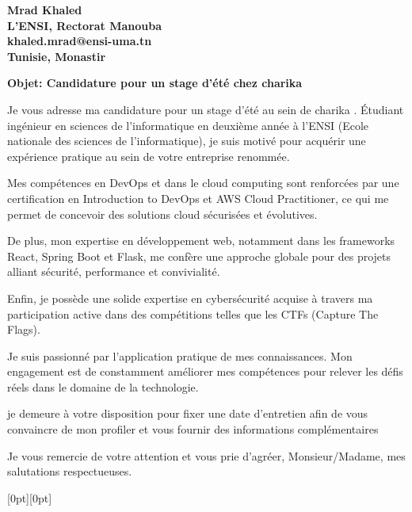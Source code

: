 \documentclass[a4paper, 12pt]{letter}
\date{}
\begin{document}
\begin{letter}
{
\selectfont
\bfseries
    Mrad Khaled\\
    L'ENSI, Rectorat Manouba\\
    khaled.mrad@ensi-uma.tn	\\ Tunisie, Monastir 	 \newline \newline
    
 
    
}

\opening { {
\selectfont
\bfseries Objet: Candidature pour un stage d'été chez charika } \newline}

\selectfont

Je vous adresse ma candidature pour un stage d'été au sein de charika . Étudiant ingénieur en sciences de l'informatique en deuxième année à l'ENSI (Ecole nationale des sciences de l'informatique), je suis motivé pour acquérir une expérience pratique au sein de votre entreprise renommée.

Mes compétences en DevOps et dans le cloud computing sont renforcées par une certification en Introduction to DevOps et AWS Cloud Practitioner, ce qui me permet de concevoir des solutions cloud sécurisées et évolutives.

De plus, mon expertise en développement web, notamment dans les frameworks React, Spring Boot et Flask, me confère une approche globale pour des projets alliant sécurité, performance et convivialité.

Enfin, je possède une solide expertise en cybersécurité acquise à travers ma participation active dans des compétitions telles que les CTFs (Capture The Flags).

Je suis passionné par l'application pratique de mes connaissances. Mon engagement est de constamment améliorer mes compétences pour relever les défis réels dans le domaine de la technologie.

je demeure à votre disposition pour fixer une date d'entretien afin de vous convaincre de mon profiler et vous fournir des informations complémentaires

Je vous remercie de votre attention et vous prie d'agréer, Monsieur/Madame, mes salutations respectueuses.


\hspace{9cm}%
\raisebox{18.1cm}[0pt][0pt]{
\setlength{\fboxrule}{0pt}
  }
\end{letter}
\end{document}
